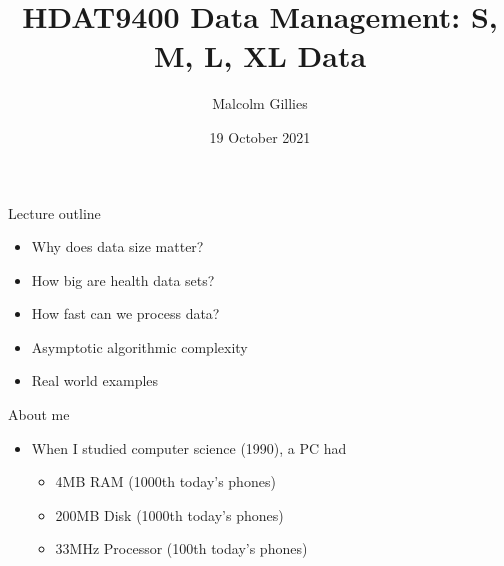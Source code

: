 \documentclass[aspectratio=169,12pt,usepdftitle=false]{beamer} %
\title{HDAT9400 Data Management: S, M, L, XL Data}
\institute{\url{https://github.com/mbg-unsw/hdat9400}}
\author{Malcolm Gillies}
\date{19 October 2021}
\begin{document}
{
\begin{frame}
\titlepage
\end{frame}
}

{
\begin{frame}[plain]
\end{frame}
}

\begin{frame}{Lecture outline}
    \begin{itemize}
	\item Why does data size matter?
	\item How big are health data sets?
	\item How fast can we process data?
	\item Asymptotic algorithmic complexity
	\item Real world examples
    \end{itemize}
\end{frame}

\begin{frame}{About me}
    \begin{itemize}
        \item When I studied computer science (1990), a PC had
	    \begin{itemize}
		\item 4MB RAM (1000th today's phones)
		\item 200MB Disk (1000th today's phones)
		\item 33MHz Processor (100th today's phones)
	    \end{itemize}
    \end{itemize}
\end{frame}
\end{document}
